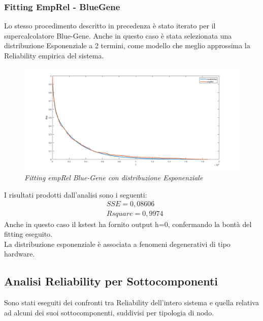 \subsubsection{Fitting EmpRel - BlueGene}
Lo stesso procedimento descritto in precedenza è stato iterato per il supercalcolatore Blue-Gene. Anche in questo caso è stata selezionata una distribuzione Esponenziale a 2 termini, come modello che meglio approssima la Reliability empirica del sistema.
\begin{figure}[H]
	\centering
	\includegraphics[width=\textwidth]{img/hw6/FittingBG.png}
	\caption{\textit{Fitting empRel Blue-Gene con distribuzione Esponenziale}}
\end{figure}
I risultati prodotti dall'analisi sono i seguenti:
\begin{equation*}
	\begin{split}
		&SSE = 0,08606\\
		&Rsquare = 0,9974
	\end{split}
\end{equation*}
Anche in questo caso il kstest ha fornito output h=0, confermando la bontà del fitting eseguito.
\\
La distribuzione esponenziale è associata a fenomeni degenerativi di tipo hardware.
\subsection{Analisi Reliability per Sottocomponenti}
Sono stati eseguiti dei confronti tra Reliability dell'intero sistema e quella relativa ad alcuni dei suoi sottocomponenti, suddivisi per tipologia di nodo. 
